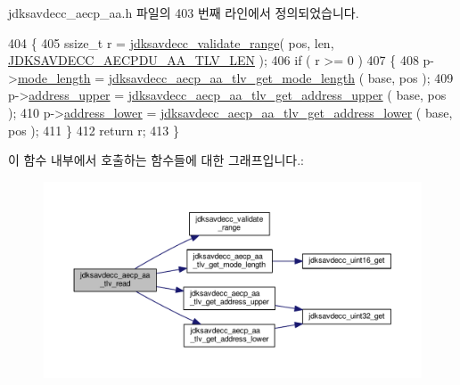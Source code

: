 jdksavdecc\+\_\+aecp\+\_\+aa.\+h 파일의 403 번째 라인에서 정의되었습니다.


\begin{DoxyCode}
404 \{
405     ssize\_t r = \hyperlink{group__util_ga9c02bdfe76c69163647c3196db7a73a1}{jdksavdecc\_validate\_range}( pos, len, 
      \hyperlink{group___a_e_c_p___a_a__tlv_ga8c9adb511e50d7ed81e30527a0f86d5b}{JDKSAVDECC\_AECPDU\_AA\_TLV\_LEN} );
406     \textcolor{keywordflow}{if} ( r >= 0 )
407     \{
408         p->\hyperlink{structjdksavdecc__aecp__aa__tlv_aa411bf53df719d8cdbc9ee46e087ef94}{mode\_length} = \hyperlink{group__aecp__aa__tlv_gab216c61c803887b69f5bed56b7291fe2}{jdksavdecc\_aecp\_aa\_tlv\_get\_mode\_length}
      ( base, pos );
409         p->\hyperlink{structjdksavdecc__aecp__aa__tlv_ab0df98b893a141626b459c7b2044f8a7}{address\_upper} = \hyperlink{group__aecp__aa__tlv_ga716b6083b980c94e32875aa603166baf}{jdksavdecc\_aecp\_aa\_tlv\_get\_address\_upper}
      ( base, pos );
410         p->\hyperlink{structjdksavdecc__aecp__aa__tlv_ac321f0e93cb752462e777998c2342240}{address\_lower} = \hyperlink{group__aecp__aa__tlv_ga11c316fda9bff646d2d134e03c39d6a4}{jdksavdecc\_aecp\_aa\_tlv\_get\_address\_lower}
      ( base, pos );
411     \}
412     \textcolor{keywordflow}{return} r;
413 \}
\end{DoxyCode}


이 함수 내부에서 호출하는 함수들에 대한 그래프입니다.\+:
\nopagebreak
\begin{figure}[H]
\begin{center}
\leavevmode
\includegraphics[width=350pt]{group__aecp__aa__tlv_gaf24b855de109d9c012ec94d9ab5ba03a_cgraph}
\end{center}
\end{figure}


